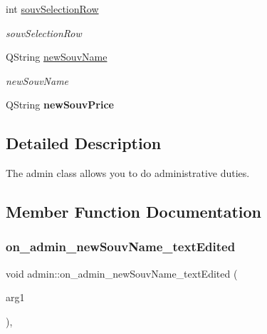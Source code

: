 \begin{DoxyCompactItemize}
int \hyperlink{classadmin_a8e90fdfeb2ac31f837dcc71dd2bcb04e}{souv\+Selection\+Row}
\begin{DoxyCompactList}\small\item\em souv\+Selection\+Row \end{DoxyCompactList}\item 
\mbox{\label{classadmin_af46ad69044f75453d7a92f8ec7fbc3dc}} 
Q\+String \hyperlink{classadmin_af46ad69044f75453d7a92f8ec7fbc3dc}{new\+Souv\+Name}
\begin{DoxyCompactList}\small\item\em new\+Souv\+Name \end{DoxyCompactList}\item 
\mbox{\label{classadmin_aa717b22c58841243456edfa57de30748}} 
Q\+String {\bfseries new\+Souv\+Price}
\end{DoxyCompactItemize}


\subsection{Detailed Description}
The admin class allows you to do administrative duties. 

\subsection{Member Function Documentation}
\mbox{\label{classadmin_a2398941babf4ee8821f6a6ba32581993}} 
\subsubsection{\texorpdfstring{on\+\_\+admin\+\_\+new\+Souv\+Name\+\_\+text\+Edited}{on\_admin\_newSouvName\_textEdited}}
{\footnotesize\ttfamily void admin\+::on\+\_\+admin\+\_\+new\+Souv\+Name\+\_\+text\+Edited (\begin{DoxyParamCaption}\item[{const Q\+String \&}]{arg1 }\end{DoxyParamCaption})\hspace{0.3cm}{\ttfamily [private]}, {\ttfamily [slot]}}



